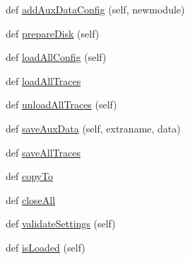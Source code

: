 \begin{DoxyCompactItemize}
def \hyperlink{classsoftware_1_1chipwhisperer_1_1common_1_1traces_1_1__base_1_1TraceContainer_a2fb6a15b9b97c268a34c42868a6e8a8b}{add\+Aux\+Data\+Config} (self, newmodule)
\item 
def \hyperlink{classsoftware_1_1chipwhisperer_1_1common_1_1traces_1_1__base_1_1TraceContainer_aa9a1021044d856b15a752af03e005c1f}{prepare\+Disk} (self)
\item 
def \hyperlink{classsoftware_1_1chipwhisperer_1_1common_1_1traces_1_1__base_1_1TraceContainer_a12fcbb7da7e2fc905e29b6e3768b794e}{load\+All\+Config} (self)
\item 
def \hyperlink{classsoftware_1_1chipwhisperer_1_1common_1_1traces_1_1__base_1_1TraceContainer_a57543922d4504879d52ea9bdb009e1cf}{load\+All\+Traces}
\item 
def \hyperlink{classsoftware_1_1chipwhisperer_1_1common_1_1traces_1_1__base_1_1TraceContainer_a9f2929fc6b467735a2e69f190c1240b2}{unload\+All\+Traces} (self)
\item 
def \hyperlink{classsoftware_1_1chipwhisperer_1_1common_1_1traces_1_1__base_1_1TraceContainer_aec187ddeee55da55d5e931a9c8b47bcd}{save\+Aux\+Data} (self, extraname, data)
\item 
def \hyperlink{classsoftware_1_1chipwhisperer_1_1common_1_1traces_1_1__base_1_1TraceContainer_a576f9e6a77791d166708d2e357e4b3f3}{save\+All\+Traces}
\item 
def \hyperlink{classsoftware_1_1chipwhisperer_1_1common_1_1traces_1_1__base_1_1TraceContainer_adfd86db486b2e9d6c7a08ef5ccbf5363}{copy\+To}
\item 
def \hyperlink{classsoftware_1_1chipwhisperer_1_1common_1_1traces_1_1__base_1_1TraceContainer_ad004d38c4fbc40ee6d2b9f8dcf47e150}{close\+All}
\item 
def \hyperlink{classsoftware_1_1chipwhisperer_1_1common_1_1traces_1_1__base_1_1TraceContainer_a5dc7836382b543366e65c68ce9c16f70}{validate\+Settings} (self)
\item 
def \hyperlink{classsoftware_1_1chipwhisperer_1_1common_1_1traces_1_1__base_1_1TraceContainer_a1e085dfebb4f4016b7ea0e55bb81b057}{is\+Loaded} (self)
\end{DoxyCompactItemize}
